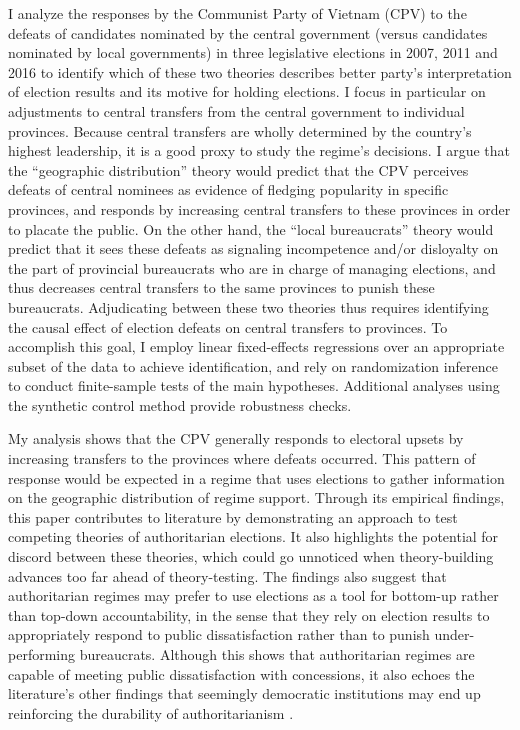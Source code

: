 \documentclass[12pt]{article}\usepackage[]{graphicx}\usepackage[]{color}
\newcommand{\1}{\mathbbm{1}}
\begin{document}
I analyze the responses by the Communist Party of Vietnam (CPV) to the defeats of candidates nominated by the central government (versus candidates nominated by local governments) in three legislative elections in 2007, 2011 and 2016 to identify which of these two theories describes better party's interpretation of election results and its motive for holding elections. I focus in particular on adjustments to central transfers from the central government to individual provinces. Because central transfers are wholly determined by the country's highest leadership, it is a good proxy to study the regime's decisions. I argue that the ``geographic distribution'' theory would predict that the CPV perceives defeats of central nominees as evidence of fledging popularity in specific provinces, and responds by increasing central transfers to these provinces in order to placate the public. On the other hand, the ``local bureaucrats'' theory would predict that it sees these defeats as signaling incompetence and/or disloyalty on the part of provincial bureaucrats who are in charge of managing elections, and thus decreases central transfers to the same provinces to punish these bureaucrats. Adjudicating between these two theories thus requires identifying the causal effect of election defeats on central transfers to provinces. To accomplish this goal, I employ linear fixed-effects regressions over an appropriate subset of the data to achieve identification, and rely on randomization inference to conduct finite-sample tests of the main hypotheses. Additional analyses using the synthetic control method provide robustness checks.

My analysis shows that the CPV generally responds to electoral upsets by increasing transfers to the provinces where defeats occurred. This pattern of response would be expected in a regime that uses elections to gather information on the geographic distribution of regime support. Through its empirical findings, this paper contributes to literature by demonstrating an approach to test competing theories of authoritarian elections. It also highlights the potential for discord between these theories, which could go unnoticed when theory-building advances too far ahead of theory-testing. The findings also suggest that authoritarian regimes may prefer to use elections as a tool for bottom-up rather than top-down accountability, in the sense that they rely on election results to appropriately respond to public dissatisfaction rather than to punish under-performing bureaucrats. Although this shows that authoritarian regimes are capable of meeting public dissatisfaction with concessions, it also echoes the literature's other findings that seemingly democratic institutions may end up reinforcing the durability of authoritarianism \citep[e.g.][]{BoixSvolik2013, GandhiPrzeworski2007}.
\end{document}
